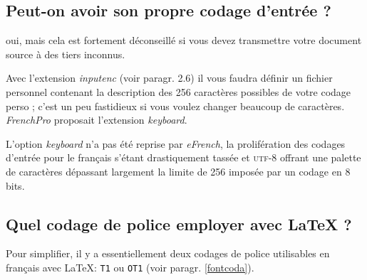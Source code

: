 \documentclass[a4paper,12pt,openright]{article}
\begin{document}
\subsection{Peut-on avoir son propre codage d'entrée ?}
\label{soncodent}
 oui, mais cela est fortement déconseillé si vous devez transmettre votre
document source à des tiers inconnus.

 Avec l'extension \textit{inputenc} (voir paragr. 2.6) il vous faudra définir
un fichier personnel contenant la description des 256 caractères possibles de
votre codage perso ; c'est un peu fastidieux si vous voulez changer beaucoup
de caractères.
\textit{FrenchPro} proposait l'extension \textit{keyboard}. 

\begin{MAJ}
L'option \textit{keyboard} n'a pas été reprise par \textit{eFrench},
 la prolifération des codages d'entrée pour le français s'étant 
drastiquement tassée et \textsc{utf-8} offrant une palette de caractères dépassant largement
la limite de 256 imposée par un codage en 8 bits.
\end{MAJ}
\subsection{Quel codage de police employer avec \LaTeX{} ?}
 Pour simplifier, il y a essentiellement deux codages de police utilisables
en français avec \LaTeX: \texttt{T1} ou \texttt{OT1} (voir paragr. \ref{fontcoda}).\indpos
\end{document}

